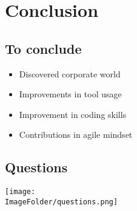 %
%

\section{Conclusion}

\subsection{To conclude}
\begin{FrameWithSubSection}
    \begin{itemize}
            \item Discovered corporate world
            \item Improvements in tool usage
            \item Improvement in coding skills
            \item Contributions in agile mindset
    \end{itemize}
\end{FrameWithSubSection}

\subsection{Questions}
\begin{FrameWithSubSection}
    \center
  \texttt{[image: \\ImageFolder/questions.png]}
\end{FrameWithSubSection}

